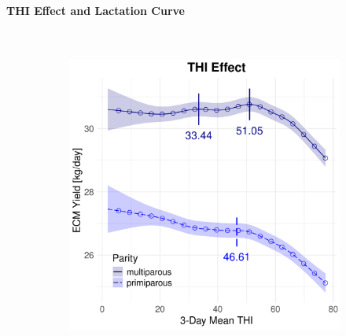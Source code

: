 \newpage
\paragraph{THI Effect and Lactation Curve} \quad \\
\begin{figure}[H]
    \centering
    \begin{subfigure}[b]{0.45\textwidth}
        \centering
        \includegraphics[width=\textwidth]{thesis/figures/models/ecm/full/ho_ecm_full/ho_ecm_full_marginal_thi_milk_combined.png}
    \end{subfigure}
    \hspace{0.05\textwidth} %
    \begin{subfigure}[b]{0.45\textwidth}
        \centering

\end{subfigure}
\end{figure}
